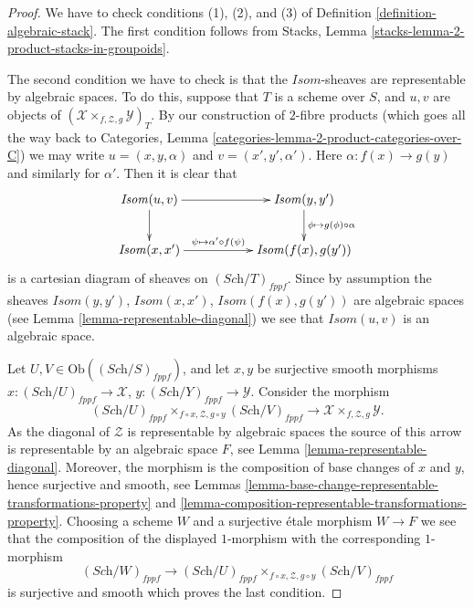 \begin{proof}
We have to check conditions (1), (2), and (3) of
Definition \ref{definition-algebraic-stack}.
The first condition follows from
Stacks, Lemma \ref{stacks-lemma-2-product-stacks-in-groupoids}.

\medskip\noindent
The second condition we have to check is that the $\mathit{Isom}$-sheaves
are representable by algebraic spaces. To do this, suppose that
$T$ is a scheme over $S$, and $u, v$ are objects of
$(\mathcal{X} \times_{f, \mathcal{Z}, g} \mathcal{Y})_T$.
By our construction of $2$-fibre products (which goes all the way
back to
Categories, Lemma \ref{categories-lemma-2-product-categories-over-C})
we may write $u = (x, y, \alpha)$ and $v = (x', y', \alpha')$.
Here $\alpha : f(x) \to g(y)$ and similarly for $\alpha'$.
Then it is clear that
$$
\xymatrix{
\mathit{Isom}(u, v) \ar[d] \ar[rr] & &
\mathit{Isom}(y, y') \ar[d]^{\phi \mapsto g(\phi) \circ \alpha} \\
\mathit{Isom}(x, x') \ar[rr]^-{\psi \mapsto \alpha' \circ f(\psi)} & &
\mathit{Isom}(f(x), g(y'))
}
$$
is a cartesian diagram of sheaves on $(\textit{Sch}/T)_{fppf}$.
Since by assumption the sheaves
$\mathit{Isom}(y, y')$, $\mathit{Isom}(x, x')$, $\mathit{Isom}(f(x), g(y'))$
are algebraic spaces (see
Lemma \ref{lemma-representable-diagonal})
we see that $\mathit{Isom}(u, v)$
is an algebraic space.

\medskip\noindent
Let $U, V \in \text{Ob}((\textit{Sch}/S)_{fppf})$,
and let $x, y$ be surjective smooth morphisms
$x : (\textit{Sch}/U)_{fppf} \to \mathcal{X}$,
$y : (\textit{Sch}/Y)_{fppf} \to \mathcal{Y}$.
Consider the morphism
$$
(\textit{Sch}/U)_{fppf}
\times_{f \circ x, \mathcal{Z}, g \circ y}
(\textit{Sch}/V)_{fppf}
\longrightarrow
\mathcal{X} \times_{f, \mathcal{Z}, g} \mathcal{Y}.
$$
As the diagonal of $\mathcal{Z}$ is representable by algebraic spaces
the source of this arrow is representable by an algebraic space $F$, see
Lemma \ref{lemma-representable-diagonal}.
Moreover, the morphism is the composition
of base changes of $x$ and $y$, hence surjective and smooth, see
Lemmas \ref{lemma-base-change-representable-transformations-property} and
\ref{lemma-composition-representable-transformations-property}.
Choosing a scheme $W$ and a surjective \'etale morphism $W \to F$
we see that the composition of the displayed $1$-morphism
with the corresponding $1$-morphism
$$
(\textit{Sch}/W)_{fppf}
\longrightarrow
(\textit{Sch}/U)_{fppf}
\times_{f \circ x, \mathcal{Z}, g \circ y}
(\textit{Sch}/V)_{fppf}
$$
is surjective and smooth which proves the last condition.
\end{proof}

